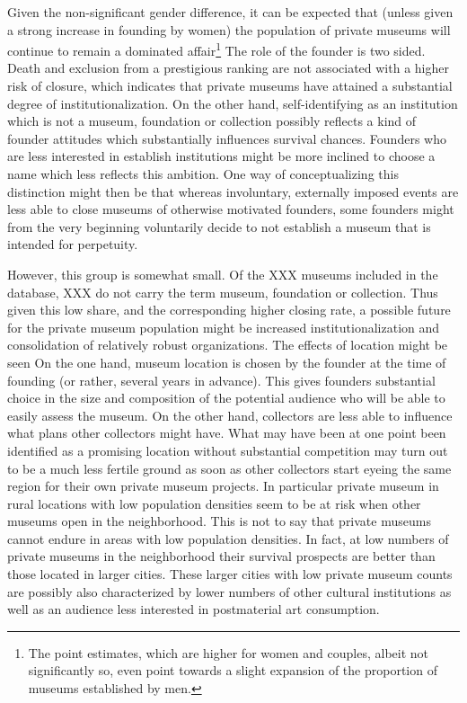 \documentclass[12pt]{article}
\begin{document}
Given the non-significant gender difference, it can be expected that (unless given a strong increase in founding by women) the population of private museums will continue to remain a dominated affair\footnote{The point estimates, which are higher for women and couples, albeit not significantly so, even point towards a slight expansion of the proportion of museums established by men.}
The role of the founder is two sided.
Death and exclusion from a prestigious ranking are not associated with a higher risk of closure, which indicates that private museums have attained a substantial degree of institutionalization.
On the other hand, self-identifying as an institution which is not a museum, foundation or collection possibly reflects a kind of founder attitudes which substantially influences survival chances.
Founders who are less interested in establish institutions might be more inclined to choose a name which less reflects this ambition. 
One way of conceptualizing this distinction might then be that whereas involuntary, externally imposed events are less able to close museums of otherwise motivated founders, some founders might from the very beginning voluntarily decide to not establish a museum that is intended for perpetuity.


However, this group is somewhat small.
Of the XXX museums included in the database, XXX do not carry the term museum, foundation or collection.
Thus given this low share, and the corresponding  higher closing rate, a possible future for the private museum population might be increased institutionalization and consolidation of relatively robust organizations.
The effects of location might be seen
On the one hand, museum location is chosen by the founder at the time of founding (or rather, several years in advance).
This gives founders substantial choice in the size and composition of the potential audience who will be able to easily assess the museum.
On the other hand, collectors are less able to influence what plans other collectors might have.
What may have been at one point been identified as a promising location without substantial competition may turn out to be a much less fertile ground as soon as other collectors start eyeing the same region for their own private museum projects.
In particular private museum in rural locations with low population densities seem to be at risk when other museums open in the neighborhood. 
This is not to say that private museums cannot endure in areas with low population densities. 
In fact, at low numbers of private museums in the neighborhood their survival prospects are better than those located in larger cities.
These larger cities with low private museum counts are possibly also characterized by lower numbers of other cultural institutions as well as an audience less interested in postmaterial art consumption.
\end{document}
